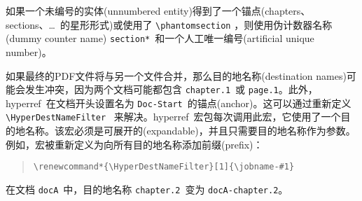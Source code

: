 \documentclass{article}
\newcommand*{\cs}[1]{%
  \texttt{\textbackslash #1}%
}
\newcommand*{\xpackage}[1]{\textsf{#1}}
\begin{document}
如果一个未编号的实体(unnumbered entity)得到了一个锚点(chapters、sections、\dots~的星形形式)或使用了 \cs{phantomsection}，则使用伪计数器名称(dummy counter name) \texttt{section*}\ 和一个人工唯一编号(artificial unique number)。

如果最终的PDF文件将与另一个文件合并，那么目的地名称(destination names)可能会发生冲突，因为两个文档可能都包含 \texttt{chapter.1}\ 或 \texttt{page.1}。此外，\xpackage{hyperref}\ 在文档开头设置名为 \texttt{Doc-Start}\ 的锚点(anchor)。这可以通过重新定义 \cs{HyperDestNameFilter}\ 来解决。\xpackage{hyperref}\ 宏包每次调用此宏，它使用了一个目的地名称。该宏必须是可展开的(expandable)，并且只需要目的地名称作为参数。例如，宏被重新定义为向所有目的地名称添加前缀(prefix)：
\begin{quote}
  \begin{verbatim}
\renewcommand*{\HyperDestNameFilter}[1]{\jobname-#1}
\end{verbatim}
\end{quote}
在文档 \texttt{docA}\ 中，目的地名称 \texttt{chapter.2}\ 变为 \texttt{docA-chapter.2}。
\end{document}
